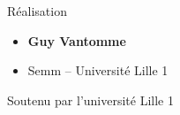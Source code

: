 \begin{frame}
\begin{minipage}{0.75\textwidth}
  \medskip

  Réalisation
  \begin{itemize}
    \item {\bf Guy Vantomme}   
    \item Semm -- Université Lille 1
  \end{itemize}

  \medskip

  Soutenu par l'université Lille 1


  \end{minipage}  



\end{frame}


